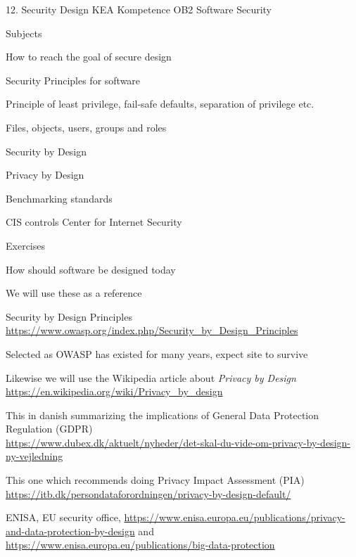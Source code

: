 \documentclass[Screen16to9,17pt]{foils}
\begin{document}
\mytitlepage
{12. Security Design}
{KEA Kompetence OB2 Software Security}


\begin{list1}
\item Subjects
\begin{list2}
\item How to reach the goal of secure design
\item Security Principles for software
\item Principle of least privilege, fail-safe defaults, separation of privilege etc.
\item Files, objects, users, groups and roles
\item Security by Design
\item Privacy by Design
\item Benchmarking standards
\item CIS controls Center for Internet Security
\end{list2}
\item Exercises
\begin{list2}
\item How should software be designed today
\end{list2}
\end{list1}


\begin{list1}
\item We will use these as a reference
\item Security by Design Principles\\
\url{https://www.owasp.org/index.php/Security_by_Design_Principles}
\item Selected as OWASP has existed for many years, expect site to survive

\item Likewise we will use the Wikipedia article about \emph{Privacy by Design}\\
\url{https://en.wikipedia.org/wiki/Privacy_by_design}
\end{list1}



\begin{list2}
\item This in danish summarizing the implications of General Data Protection Regulation (GDPR)\\
{\footnotesize\url{https://www.dubex.dk/aktuelt/nyheder/det-skal-du-vide-om-privacy-by-design-ny-vejledning}}
\item This one which recommends doing Privacy Impact Assessment (PIA)\\
{\footnotesize\url{https://itb.dk/persondataforordningen/privacy-by-design-default/}}
\item ENISA, EU security office, {\footnotesize\url{https://www.enisa.europa.eu/publications/privacy-and-data-protection-by-design}} and {\footnotesize\url{https://www.enisa.europa.eu/publications/big-data-protection}}
\end{list2}
\end{document}
